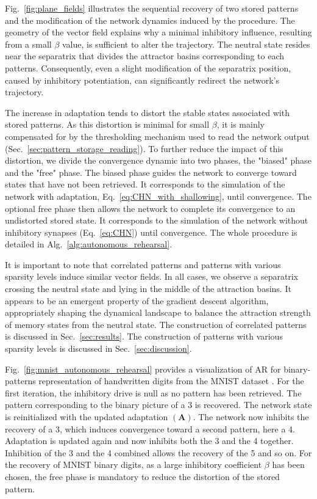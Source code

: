 \documentclass[10pt,letterpaper]{article}
\begin{document}
Fig.~\ref{fig:plane_fields} illustrates the sequential recovery of two stored patterns and the modification of the network dynamics induced by the procedure. The geometry of the vector field explains why a minimal inhibitory influence, resulting from a small $\beta$ value, is sufficient to alter the trajectory. The neutral state resides near the separatrix that divides the attractor basins corresponding to each patterns. Consequently, even a slight modification of the separatrix position, caused by inhibitory potentiation, can significantly redirect the network's trajectory.

The increase in adaptation tends to distort the stable states associated with stored patterns. As this distortion is minimal for small $\beta$, it is mainly compensated for by the thresholding mechanism used to read the network output (Sec.~\ref{sec:pattern_storage_reading}). To further reduce the impact of this distortion, we divide the convergence dynamic into two phases, the "biased" phase and the "free" phase. 
The biased phase guides the network to converge toward states that have not been retrieved. It corresponds to the simulation of the network with adaptation, Eq.~\ref{eq:CHN_with_shallowing}, until convergence.
The optional free phase then allows the network to complete its convergence to an undistorted stored state. It corresponds to the simulation of the network without inhibitory synapses (Eq.~\ref{eq:CHN}) until convergence. 
The whole procedure is detailed in Alg.~\ref{alg:autonomous_rehearsal}.

It is important to note that correlated patterns and patterns with various sparsity levels induce similar vector fields. In all cases, we observe a separatrix crossing the neutral state and lying in the middle of the attraction basins. It appears to be an emergent property of the gradient descent algorithm, appropriately shaping the dynamical landscape to balance the attraction strength of memory states from the neutral state. The construction of correlated patterns is discussed in Sec.~\ref{sec:results}.  The construction of patterns with various sparsity levels is discussed in Sec.~\ref{sec:discussion}.

Fig.~\ref{fig:mnist_autonomous_rehearsal} provides a visualization of AR for binary-patterns representation of handwritten digits from the MNIST dataset \cite{lecun_mnist_1998}. For the first iteration, the inhibitory drive is null as no pattern has been retrieved. The pattern corresponding to the binary picture of a 3 is recovered. The network state is reinitialized with the updated adaptation $(\mathbf{A})$. The network now inhibits the recovery of a 3, which induces convergence toward a second pattern, here a 4. Adaptation is updated again and now inhibits both the 3 and the 4 together. Inhibition of the 3 and the 4 combined allows the recovery of the 5 and so on. For the recovery of MNIST binary digits, as a large inhibitory coefficient $\beta$ has been chosen,  the free phase is mandatory to reduce the distortion of the stored pattern.
\end{document}

